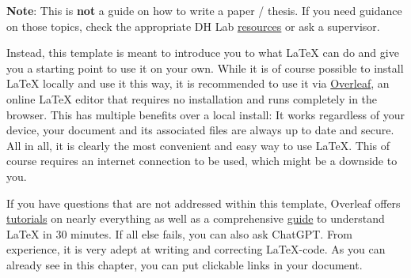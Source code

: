 \documentclass[12pt, a4paper, ngerman, bidi=default]{article}
\begin{document}
\textbf{Note}: This is \textbf{not} a guide on how to write a paper / thesis. If you need guidance on those topics, check the appropriate DH
Lab \href{https://dhlab.philhist.unibas.ch/en/master-course/seminar-masterarbeit-masterpruefung/}{resources} or ask a supervisor.

Instead, this template is meant to introduce you to what LaTeX can do and give you a starting point to use it on your own. While it is of course possible to install LaTeX locally and use it this way, it is recommended to use it via \href{https://www.overleaf.com}{Overleaf}, an online LaTeX editor that requires no installation and runs completely in the browser. This has multiple benefits over a local install: It works regardless of your device, your document and its associated files are always up to date and secure. All in all, it is clearly the most convenient and easy way to use LaTeX. This of course requires an internet connection to be used, which might be a downside to you.

If you have questions that are not addressed within this template, Overleaf offers \href{https://www.overleaf.com/learn/latex/Tutorials}{tutorials} on nearly everything as well as a comprehensive \href{https://www.overleaf.com/learn/latex/Learn_LaTeX_in_30_minutes}{guide} to understand LaTeX in 30 minutes. If all else fails, you can also ask ChatGPT. From experience, it is very adept at writing and correcting LaTeX-code. As you can already see in this chapter, you can put clickable links in your document.


\end{document}
